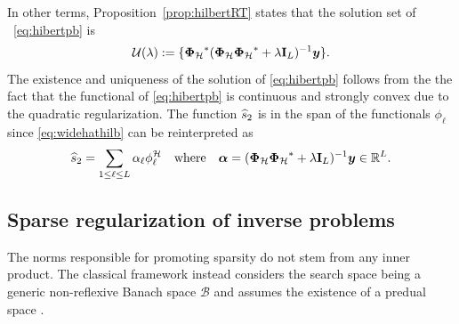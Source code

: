\documentclass[12pt]{article}
\begin{document}
    \noindent In other terms, Proposition~\ref{prop:hilbertRT} states that the solution set of ~\eqref{eq:hibertpb} is 
    \begin{equation}
        \mathcal{U} (\lambda) := \{ {\bm{\Phi}_\mathcal{H}}^* ( {\bm{\Phi}_\mathcal{H}} {\bm{\Phi}_\mathcal{H}}^* + \lambda \mathbf{I}_L)^{-1} \bm{y}\}.
    \end{equation}
    The existence and uniqueness of the solution of \eqref{eq:hibertpb} follows from the the fact that the functional of \eqref{eq:hibertpb} is continuous and strongly convex due to the quadratic regularization.
    The function $ \widehat{s}_2 $ is in the span of the functionals $\phi_\ell$ since \eqref{eq:widehathilb} can be reinterpreted as 
    \begin{equation*}
    \widehat{s}_2  = \sum_{1 \leq \ell \leq L} \alpha_\ell \phi_\ell^{\mathcal{H}} \quad \text{where} \quad \bm{\alpha} = ( {\bm{\Phi}_\mathcal{H}} {\bm{\Phi}_\mathcal{H}}^* + \lambda \mathbf{I}_L)^{-1} \bm{y} \in \mathbb{R}^L. 
    \end{equation*}

    
    
    \subsection{Sparse regularization of inverse problems}

    The norms responsible for promoting sparsity do not stem from any inner product. The classical framework instead considers the search space being a generic non-reflexive Banach space $\mathcal{B}$ and assumes the existence of a predual space \cite{unser2021unifying}.
    
\end{document}

